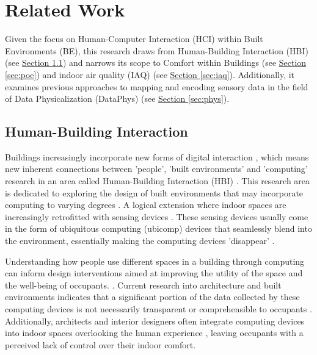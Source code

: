 \section{Related Work}
\label{sec:related_work}

Given the focus on Human-Computer Interaction (HCI) within Built Environments (BE), this research draws from Human-Building Interaction (HBI) (see \hyperref[sec:hbi]{Section \ref*{sec:hbi}}) and narrows its scope to Comfort within Buildings (see \hyperref[sec:poe]{Section \ref*{sec:poe}}) and indoor air quality (IAQ) (see \hyperref[sec:iaq]{Section \ref*{sec:iaq}}). Additionally, it examines previous approaches to mapping and encoding sensory data in the field of Data Physicalization (DataPhys) (see \hyperref[sec:phys]{Section \ref*{sec:phys}}).



\subsection{Human-Building Interaction}
\label{sec:hbi}

Buildings increasingly incorporate new forms of digital interaction \cite{pulsipher_towards_2023, margariti_understanding_2023}, which means new inherent connections between 'people', 'built environments' and 'computing' research in an area called Human-Building Interaction (HBI) \cite{alavi_introduction_2019, taherkhani_human-building_2023}. This research area is dedicated to exploring the design of built environments that may incorporate computing to varying degrees \cite{sowles_introducing_2021}. A logical extension where indoor spaces are increasingly retrofitted with sensing devices \cite{pulsipher_towards_2023}. These sensing devices usually come in the form of ubiquitous computing (ubicomp) \cite{bell_yesterdays_2007} devices that seamlessly blend into the environment, essentially making the computing devices 'disappear' \cite{weiser_computer_1999}. 

Understanding how people use different spaces in a building through computing can inform design interventions aimed at improving the utility of the space and the well-being of occupants. \cite{verma_studying_2017}. Current research into architecture and built environments indicates that a significant portion of the data collected by these computing devices is not necessarily transparent or comprehensible to occupants \cite{schnadelbach_adaptive_2019}. Additionally, architects and interior designers often integrate computing devices into indoor spaces overlooking the human experience \cite{johansen_temporal_2019, kirsh_architects_2019}, leaving occupants with a perceived lack of control over their indoor comfort. 

